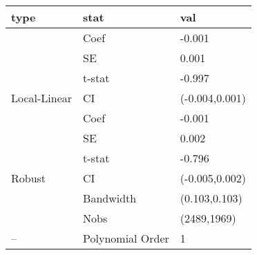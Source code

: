 
\begin{tabular}{lll}
\toprule
type & stat & val\\
\midrule
 & Coef & -0.001\\

 & SE & 0.001\\

 & t-stat & -0.997\\

\multirow{-4}{*}{\raggedright\arraybackslash Local-Linear} & CI & (-0.004,0.001)\\
\cmidrule{1-3}
 & Coef & -0.001\\

 & SE & 0.002\\

 & t-stat & -0.796\\

\multirow{-4}{*}{\raggedright\arraybackslash Robust} & CI & (-0.005,0.002)\\
\cmidrule{1-3}
 & Bandwidth & (0.103,0.103)\\

 & Nobs & (2489,1969)\\

\multirow{-3}{*}{\raggedright\arraybackslash --} & Polynomial Order & 1\\
\bottomrule
\end{tabular}